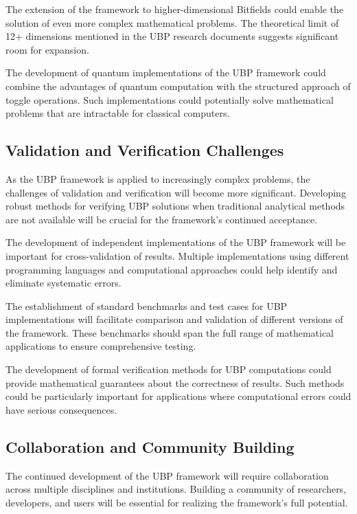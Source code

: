 \documentclass[11pt]{amsart}
\begin{document}
The extension of the framework to higher-dimensional Bitfields could enable the solution of even more complex mathematical problems. The theoretical limit of 12+ dimensions mentioned in the UBP research documents suggests significant room for expansion.

The development of quantum implementations of the UBP framework could combine the advantages of quantum computation with the structured approach of toggle operations. Such implementations could potentially solve mathematical problems that are intractable for classical computers.

\subsection{Validation and Verification Challenges}

As the UBP framework is applied to increasingly complex problems, the challenges of validation and verification will become more significant. Developing robust methods for verifying UBP solutions when traditional analytical methods are not available will be crucial for the framework's continued acceptance.

The development of independent implementations of the UBP framework will be important for cross-validation of results. Multiple implementations using different programming languages and computational approaches could help identify and eliminate systematic errors.

The establishment of standard benchmarks and test cases for UBP implementations will facilitate comparison and validation of different versions of the framework. These benchmarks should span the full range of mathematical applications to ensure comprehensive testing.

The development of formal verification methods for UBP computations could provide mathematical guarantees about the correctness of results. Such methods could be particularly important for applications where computational errors could have serious consequences.

\subsection{Collaboration and Community Building}

The continued development of the UBP framework will require collaboration across multiple disciplines and institutions. Building a community of researchers, developers, and users will be essential for realizing the framework's full potential.
\end{document}
